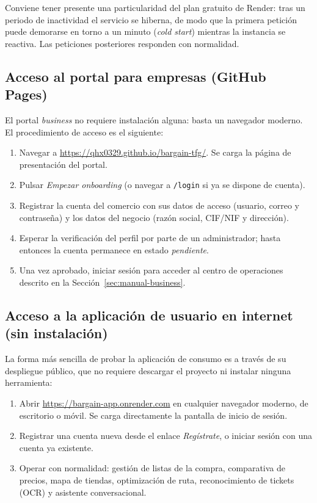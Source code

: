 Conviene tener presente una particularidad del plan gratuito de Render: tras un periodo de
inactividad el servicio se hiberna, de modo que la primera petici\'on puede demorarse en torno a
un minuto (\emph{cold start}) mientras la instancia se reactiva. Las peticiones posteriores
responden con normalidad.

\subsection{Acceso al portal para empresas (GitHub Pages)}\label{subsec:manual-acceso-portal}

El portal \emph{business} no requiere instalaci\'on alguna: basta un navegador moderno.
El procedimiento de acceso es el siguiente:

\begin{enumerate}
  \item Navegar a \url{https://qhx0329.github.io/bargain-tfg/}. Se carga la p\'agina de
    presentaci\'on del portal.
  \item Pulsar \emph{Empezar onboarding} (o navegar a \texttt{/login} si ya se dispone de
    cuenta).
  \item Registrar la cuenta del comercio con sus datos de acceso (usuario, correo y
    contrase\~na) y los datos del negocio (raz\'on social, CIF/NIF y direcci\'on).
  \item Esperar la verificaci\'on del perfil por parte de un administrador; hasta entonces la
    cuenta permanece en estado \emph{pendiente}.
  \item Una vez aprobado, iniciar sesi\'on para acceder al centro de operaciones descrito en la
    Secci\'on~\ref{sec:manual-business}.
\end{enumerate}

\subsection{Acceso a la aplicaci\'on de usuario en internet (sin instalaci\'on)}\label{subsec:manual-web-publico}

La forma m\'as sencilla de probar la aplicaci\'on de consumo es a trav\'es de su despliegue
p\'ublico, que no requiere descargar el proyecto ni instalar ninguna herramienta:

\begin{enumerate}
  \item Abrir \url{https://bargain-app.onrender.com} en cualquier navegador moderno, de
    escritorio o m\'ovil. Se carga directamente la pantalla de inicio de sesi\'on.
  \item Registrar una cuenta nueva desde el enlace \emph{Reg\'istrate}, o iniciar sesi\'on con
    una cuenta ya existente.
  \item Operar con normalidad: gesti\'on de listas de la compra, comparativa de precios, mapa
    de tiendas, optimizaci\'on de ruta, reconocimiento de tickets (OCR) y asistente
    conversacional.
\end{enumerate}

